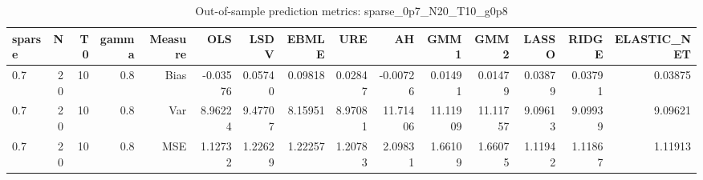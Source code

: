 \begin{table}[!htbp]\centering
\caption{Out-of-sample prediction metrics: sparse_0p7_N20_T10_g0p8}
\label{tab:table3_sparse_0p7_N20_T10_g0p8}
\begin{tabular}{lrrrrrrrrrrrrrr}
\hline
sparse & N & T0 & gamma & Measure & OLS & LSDV & EBMLE & URE & AH & GMM1 & GMM2 & LASSO & RIDGE & ELASTIC_NET \\
\hline
0.7 & 20 & 10 & 0.8 & Bias & -0.03576 & 0.05740 & 0.09818 & 0.02847 & -0.00726 & 0.01491 & 0.01479 & 0.03879 & 0.03791 & 0.03875 \\
0.7 & 20 & 10 & 0.8 & Var & 8.96224 & 9.47707 & 8.15951 & 8.97081 & 11.71406 & 11.11909 & 11.11757 & 9.09613 & 9.09939 & 9.09621 \\
0.7 & 20 & 10 & 0.8 & MSE & 1.12732 & 1.22629 & 1.22257 & 1.20783 & 2.09831 & 1.66109 & 1.66075 & 1.11942 & 1.11867 & 1.11913 \\
\hline
\end{tabular}
\end{table}

